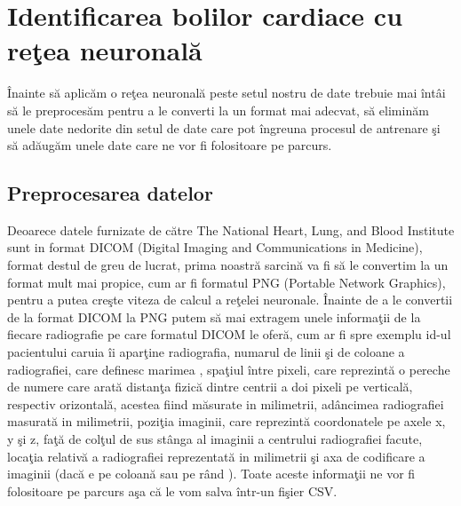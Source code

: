 \chapter{Identificarea bolilor cardiace cu re\c{t}ea neuronal\u{a}}

\^{I}nainte s\u{a} aplic\u{a}m o re\c{t}ea neuronal\u{a} peste setul nostru de date trebuie mai \^{i}nt\^{a}i s\u{a} le preproces\u{a}m pentru a le converti la un format mai adecvat, s\u{a} elimin\u{a}m unele date nedorite din setul de date care pot \^{i}ngreuna procesul de antrenare \c{s}i s\u{a} ad\u{a}ug\u{a}m unele date care ne vor fi folositoare pe parcurs.

\section{Preprocesarea datelor}

Deoarece datele furnizate de c\u{a}tre The National Heart, Lung, and Blood Institute sunt in format DICOM (Digital Imaging and Communications in Medicine), format destul de greu de lucrat, prima noastr\u{a} sarcin\u{a} va fi s\u{a} le convertim la un format mult mai propice, cum ar fi formatul PNG (Portable Network Graphics), pentru a putea cre\c{s}te viteza de calcul a re\c{t}elei neuronale. \^{I}nainte de a le convertii de la format DICOM la PNG putem s\u{a} mai extragem unele informa\c{t}ii de la fiecare radiografie pe care formatul DICOM le ofer\u{a}, cum ar fi spre exemplu  id-ul pacientului caruia \^{i}i apar\c{t}ine radiografia, numarul de linii \c{s}i de coloane a radiografiei, care definesc marimea , spa\c{t}iul \^{i}ntre pixeli, care reprezint\u{a} o pereche de numere care arat\u{a} distan\c{t}a fizic\u{a} dintre centrii a doi pixeli pe vertical\u{a}, respectiv orizontal\u{a}, acestea fiind m\u{a}surate in milimetrii, ad\^{a}ncimea radiografiei masurat\u{a} in milimetrii, pozi\c{t}ia imaginii, care reprezint\u{a} coordonatele pe axele x, y \c{s}i z, fa\c{t}\u{a} de col\c{t}ul de sus st\^{a}nga al imaginii a centrului  radiografiei facute, loca\c{t}ia relativ\u{a} a radiografiei reprezentat\u{a} in milimetrii \c{s}i axa de codificare a imaginii (dac\u{a} e pe coloan\u{a} sau pe r\^{a}nd ). Toate aceste informa\c{t}ii ne vor fi folositoare pe parcurs a\c{s}a c\u{a} le vom salva \^{i}ntr-un fi\c{s}ier CSV.

\par

